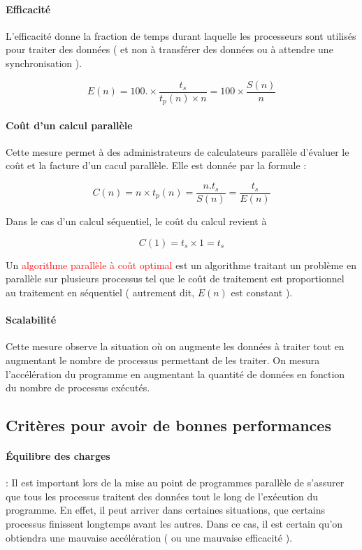 \documentclass[fleqn,11pt]{article}
\begin{document}
\paragraph{Efficacité}

L'efficacité donne la fraction de temps durant laquelle les processeurs sont utilisés pour traiter des données ( et non
à transférer des données ou à attendre une synchronisation ).

\begin{equation}
 E(n) = 100.\times \frac{t_{s}}{t_{p}(n)\times n} = 100\times\frac{S(n)}{n}
\end{equation}

\paragraph{Coût d'un calcul parallèle}

Cette mesure permet à des administrateurs de calculateurs parallèle d'évaluer le coût et la facture d'un cacul parallèle.
Elle est donnée par la formule :

\begin{equation}
 C(n) = n \times t_{p}(n) = \frac{n.t_{s}}{S(n)} = \frac{t_{s}}{E(n)}
\end{equation}

Dans le cas d'un calcul séquentiel, le coût du calcul revient à

\[
 C(1) = t_{s} \times 1 = t_{s}
\]

Un \textcolor{red}{algorithme parallèle à coût optimal} est un algorithme traitant un problème en parallèle sur plusieurs
processus tel que le coût de traitement est proportionnel au traitement en séquentiel ( autrement dit, $E(n)$ est constant ).

\paragraph{Scalabilité}

Cette mesure observe la situation où on augmente les données à traiter tout en augmentant le nombre de processus permettant de les traiter.
On mesura l'accélération du programme en augmentant la quantité de données en fonction du nombre de processus exécutés.

\subsection{Critères pour avoir de bonnes performances}

\paragraph{\'Equilibre des charges} : Il est important lors de la mise au point de programmes parallèle de s'assurer que tous les processus traitent
des données tout le long de l'exécution du programme. En effet, il peut arriver dans certaines situations, que certains processus finissent
longtemps avant les autres. Dans ce cas, il est certain qu'on obtiendra une mauvaise accélération ( ou une mauvaise efficacité ).
\end{document}
